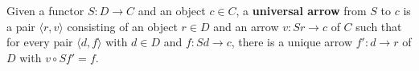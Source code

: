 Given a functor $S: D \rightarrow C$ and an object $c \in C$, a \textbf{universal arrow} from $S$ to $c$ is a pair $\langle r, v\rangle$ consisting of an object $r \in D$ and an arrow $v: Sr \rightarrow c$ of $C$ such that for every pair $\langle d, f\rangle$ with $d \in D$ and $f: Sd \rightarrow c$, there is a unique arrow $f': d \rightarrow r$ of $D$ with $v \circ Sf' = f$.